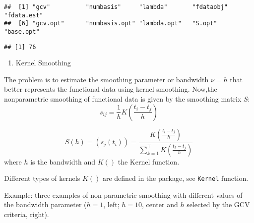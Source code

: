 \documentclass[
]{book}
\newenvironment{Shaded}{\begin{snugshade}}{\end{snugshade}}
\newcommand{\AttributeTok}[1]{\textcolor[rgb]{0.77,0.63,0.00}{#1}}
\newcommand{\DecValTok}[1]{\textcolor[rgb]{0.00,0.00,0.81}{#1}}
\newcommand{\FunctionTok}[1]{\textcolor[rgb]{0.00,0.00,0.00}{#1}}
\newcommand{\NormalTok}[1]{#1}
\newcommand{\OtherTok}[1]{\textcolor[rgb]{0.56,0.35,0.01}{#1}}
\newcommand{\SpecialCharTok}[1]{\textcolor[rgb]{0.00,0.00,0.00}{#1}}
\providecommand{\tightlist}{%
  \setlength{\itemsep}{0pt}\setlength{\parskip}{0pt}}
\begin{document}
\begin{verbatim}
##  [1] "gcv"          "numbasis"     "lambda"       "fdataobj"     "fdata.est"   
##  [6] "gcv.opt"      "numbasis.opt" "lambda.opt"   "S.opt"        "base.opt"
\end{verbatim}

\begin{Shaded}
\end{Shaded}

\begin{verbatim}
## [1] 76
\end{verbatim}

\begin{enumerate}
\def\labelenumi{\arabic{enumi}.}
\setcounter{enumi}{1}
\tightlist
\item
  Kernel Smoothing \citep{FV2006}
\end{enumerate}

The problem is to estimate the smoothing parameter or bandwidth \(\nu=h\) that better represents the functional data using kernel smoothing.
Now,the nonparametric smoothing of functional data is given by the smoothing matrix \(S\):
\[s_{ij}=\frac{1}{h}K\left(\frac{t_i-t_j}{h}\right)\]

\[S(h)=(s_j(t_i))=\frac{K\left(\frac{t_i-t_j}{h}\right)}{\sum_{k=1}^{\top}K\left(\frac{t_k-t_j}{h}\right)}\]
where \(h\) is the bandwidth and \(K()\) the Kernel function.

Different types of kernels \(K()\) are defined in the package, see \texttt{Kernel} function.

Example: three examples of non-parametric smoothing with different values of the bandwidth parameter (\(h = 1\), left; \(h = 10\), center and \(h\) selected by the GCV criteria, right).

\begin{Shaded}
\end{Shaded}
\end{document}

